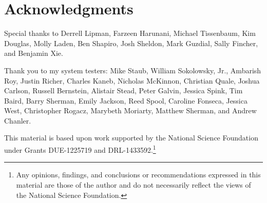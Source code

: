 \chapter*{Acknowledgments}
\renewcommand{\thefootnote}{\fnsymbol{footnote}}


Special thanks to Derrell Lipman, Farzeen Harunani, Michael Tissenbaum, Kim Douglas, Molly Laden, Ben Shapiro, Josh Sheldon, Mark Guzdial, Sally Fincher, and Benjamin Xie.

Thank you to my system testers: Mike Staub, William Sokolowsky, Jr., Ambarish Roy, Justin Richer, Charles Kaneb, Nicholas McKinnon, Christian Quale, Joshua Carlson, Russell Bernstein, Alistair Stead, Peter Galvin, Jessica Spink, Tim Baird, Barry Sherman, Emily Jackson, Reed Spool, Caroline Fonseca, Jessica West, Christopher Rogacz, Marybeth Moriarty, Matthew Sherman, and Andrew Chanler.

This material is based upon work supported by the National Science Foundation under Grants DUE-1225719 and DRL-1433592.\footnote{Any opinions, findings, and conclusions or recommendations expressed in this material are those of the author and do not necessarily reflect the views of the National Science Foundation.}

\renewcommand{\thefootnote}{\arabic{footnote}}